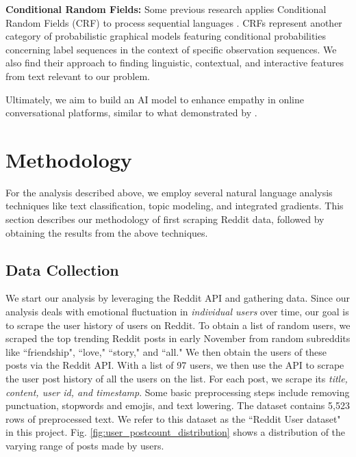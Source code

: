 \documentclass[conference,compsoc]{IEEEtran}
\begin{document}
\textbf{Conditional Random Fields: }Some previous research applies Conditional Random Fields (CRF) to process sequential languages \citep{Guo+20:opinion-holders, Zhang+Singh-19:attributed-oriented}. CRFs represent another category of probabilistic graphical models featuring conditional probabilities concerning label sequences in the context of specific observation sequences. We also find their approach to finding linguistic, contextual, and interactive features from text relevant to our problem. 

Ultimately, we aim to build an AI model to enhance empathy in online conversational platforms, similar to what demonstrated by \citet{Sharma+23:human-ai-empathic-conversation}.



\section{Methodology} \label{methodology}
For the analysis described above, we employ several natural language analysis techniques like text classification, topic modeling, and integrated gradients. This section describes our methodology of first scraping Reddit data, followed by obtaining the results from the above techniques.

\subsection{Data Collection}
We start our analysis by leveraging the Reddit API and gathering data. Since our analysis deals with emotional fluctuation in \textit{individual users} over time, our goal is to scrape the user history of users on Reddit. To obtain a list of random users, we scraped the top trending Reddit posts in early November from random subreddits like ``friendship", ``love," ``story," and ``all." We then obtain the users of these posts via the Reddit API. With a list of 97 users, we then use the API to scrape the user post history of all the users on the list. For each post, we scrape its \textit{title, content, user id, and timestamp}. Some basic preprocessing steps include removing punctuation, stopwords and emojis, and text lowering. The dataset contains 5,523 rows of preprocessed text. We refer to this dataset as the ``Reddit User dataset" in this project. Fig. \ref{fig:user_postcount_distribution} shows a distribution of the varying range of posts made by users.
\end{document}
